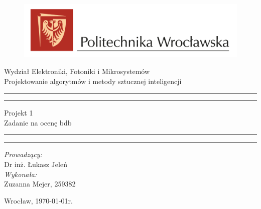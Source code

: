 \begin{titlepage}
    \begin{figure}
        \centering
        \includegraphics[width=18cm]{logo-PWr.png}
        
        \label{fig:pwr}
    \end{figure}
        \begin{center}
            \huge Wydział Elektroniki, Fotoniki i Mikrosystemów \\ 
            \vspace{40pt}
            \huge Projektowanie algorytmów i metody sztucznej inteligencji  \\
        \end{center}
        \vspace{60pt}
        \hrule
        \vspace{1pt}
        \hrule
        \begin{center}
            {\fontsize{40}{50}\selectfont Projekt 1\\ }
            \vspace{10pt}
            {\fontsize{25}{25}\selectfont Zadanie na ocenę bdb }
        \end{center}
        \hrule
        \vspace{1pt}
        \hrule
        \begin{flushright}
            \vspace{65pt}
            \textit{\Large Prowadzący:}\\
            
            \Large Dr inż. Łukasz Jeleń\\
            \vspace{10pt}
            \textit{\Large Wykonała:}\\
            \Large Zuzanna Mejer, 259382 \\
        
        \end{flushright}
        \vspace{65pt}
        \begin{center}
            \large Wrocław, \today r.
        \end{center}
    \end{titlepage}